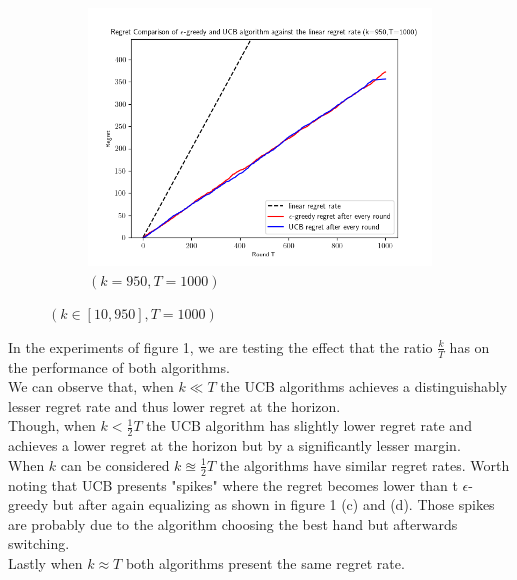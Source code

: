 \documentclass[12pt]{article}
\begin{document}
\begin{enumerate}
\begin{figure}[h!]
\begin{subfigure}[b]{0.3\textwidth}
					\includegraphics[width=\textwidth]{fig9.png}
					\caption{$(k=950, T=1000)$}
				\end{subfigure}
				\caption{$(k\in[10,950], T=1000)$}			
			\end{figure}
			
			
			In the experiments of figure 1, we are testing the effect that the ratio $\frac{k}{T}$ has on the performance of both algorithms.\\
			We can observe that, when $k\ll T$ the UCB algorithms achieves a distinguishably lesser regret rate and thus lower regret at the horizon.\\
			Though, when $k<\frac{1}{2}T$ the UCB algorithm has slightly lower regret rate and achieves a lower regret at the horizon but by a significantly lesser margin.\\
			When $k$ can be considered $k\approxeq \frac{1}{2}T$ the algorithms have similar regret rates. Worth noting that UCB presents "spikes" where the regret becomes lower than t $\epsilon$-greedy but after again equalizing as shown in figure 1 (c) and (d). Those spikes are probably due to the algorithm choosing the best hand but afterwards switching.\\
			Lastly when $k\approx T$ both algorithms present the same regret rate. \\
			

\end{enumerate}
\end{document}
